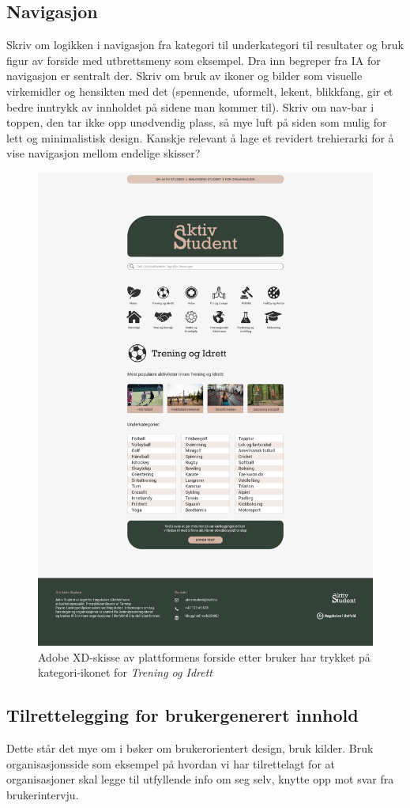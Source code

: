 \subsection{Navigasjon}
Skriv om logikken i navigasjon fra kategori til underkategori til resultater og bruk figur av forside med utbrettsmeny som eksempel. Dra inn begreper fra IA for navigasjon er sentralt der. Skriv om bruk av ikoner og bilder som visuelle virkemidler og hensikten med det (spennende, uformelt, lekent, blikkfang, gir et bedre inntrykk av innholdet på sidene man kommer til). Skriv om nav-bar i toppen, den tar ikke opp unødvendig plass, så mye luft på siden som mulig for lett og minimalistisk design. Kanskje relevant å lage et revidert trehierarki for å vise navigasjon mellom endelige skisser?

\begin{figure}[H]
\centering
\includegraphics[width=.7\textwidth]{Illustrasjoner/Skisser-pdf/3.0/3-2-forside-trykket-kategori.pdf}
\caption{Adobe XD-skisse av plattformens forside etter bruker har trykket på kategori-ikonet for {\em Trening og Idrett}}
\label{fig:3-2-forside-utbrett}
\end{figure}

\subsection{Tilrettelegging for brukergenerert innhold}
Dette står det mye om i bøker om brukerorientert design, bruk kilder. Bruk organisasjonsside som eksempel på hvordan vi har tilrettelagt for at organisasjoner skal legge til utfyllende info om seg selv, knytte opp mot svar fra brukerintervju.


